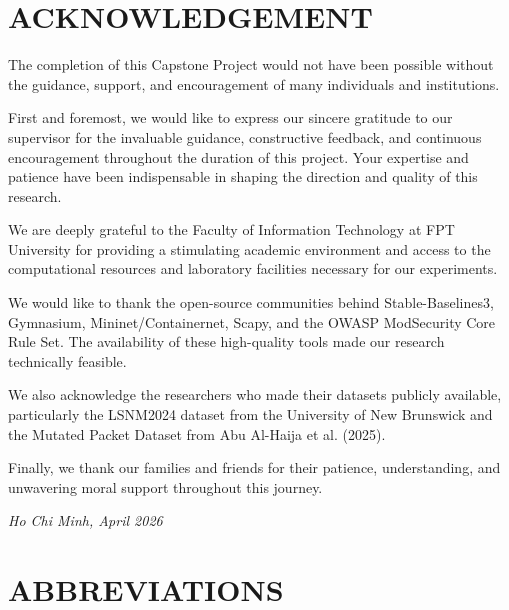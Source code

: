 \documentclass[12pt,a4paper]{report}
\begin{document}
\chapter*{ACKNOWLEDGEMENT}

The completion of this Capstone Project would not have been possible without the guidance, support, and encouragement of many individuals and institutions.

First and foremost, we would like to express our sincere gratitude to our supervisor for the invaluable guidance, constructive feedback, and continuous encouragement throughout the duration of this project. Your expertise and patience have been indispensable in shaping the direction and quality of this research.

We are deeply grateful to the Faculty of Information Technology at FPT University for providing a stimulating academic environment and access to the computational resources and laboratory facilities necessary for our experiments.

We would like to thank the open-source communities behind Stable-Baselines3, Gymnasium, Mininet/Containernet, Scapy, and the OWASP ModSecurity Core Rule Set. The availability of these high-quality tools made our research technically feasible.

We also acknowledge the researchers who made their datasets publicly available, particularly the LSNM2024 dataset from the University of New Brunswick and the Mutated Packet Dataset from Abu Al-Haija et al. (2025).

Finally, we thank our families and friends for their patience, understanding, and unwavering moral support throughout this journey.

\bigskip
\noindent\textit{Ho Chi Minh, April 2026}\\[0.5em]

\clearpage
\tableofcontents
\listoffigures
{}

\listoftables
{}

\chapter*{ABBREVIATIONS}
\end{document}
